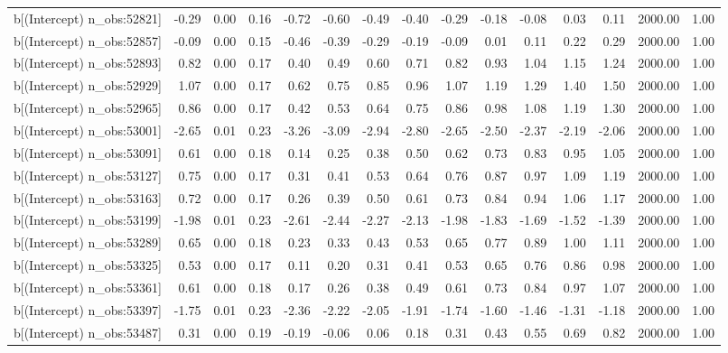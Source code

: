 \begin{table}[ht]
\begin{tabular}{rrrrrrrrrrrrrrr}
  b[(Intercept) n\_obs:52821] & -0.29 & 0.00 & 0.16 & -0.72 & -0.60 & -0.49 & -0.40 & -0.29 & -0.18 & -0.08 & 0.03 & 0.11 & 2000.00 & 1.00 \\ 
  b[(Intercept) n\_obs:52857] & -0.09 & 0.00 & 0.15 & -0.46 & -0.39 & -0.29 & -0.19 & -0.09 & 0.01 & 0.11 & 0.22 & 0.29 & 2000.00 & 1.00 \\ 
  b[(Intercept) n\_obs:52893] & 0.82 & 0.00 & 0.17 & 0.40 & 0.49 & 0.60 & 0.71 & 0.82 & 0.93 & 1.04 & 1.15 & 1.24 & 2000.00 & 1.00 \\ 
  b[(Intercept) n\_obs:52929] & 1.07 & 0.00 & 0.17 & 0.62 & 0.75 & 0.85 & 0.96 & 1.07 & 1.19 & 1.29 & 1.40 & 1.50 & 2000.00 & 1.00 \\ 
  b[(Intercept) n\_obs:52965] & 0.86 & 0.00 & 0.17 & 0.42 & 0.53 & 0.64 & 0.75 & 0.86 & 0.98 & 1.08 & 1.19 & 1.30 & 2000.00 & 1.00 \\ 
  b[(Intercept) n\_obs:53001] & -2.65 & 0.01 & 0.23 & -3.26 & -3.09 & -2.94 & -2.80 & -2.65 & -2.50 & -2.37 & -2.19 & -2.06 & 2000.00 & 1.00 \\ 
  b[(Intercept) n\_obs:53091] & 0.61 & 0.00 & 0.18 & 0.14 & 0.25 & 0.38 & 0.50 & 0.62 & 0.73 & 0.83 & 0.95 & 1.05 & 2000.00 & 1.00 \\ 
  b[(Intercept) n\_obs:53127] & 0.75 & 0.00 & 0.17 & 0.31 & 0.41 & 0.53 & 0.64 & 0.76 & 0.87 & 0.97 & 1.09 & 1.19 & 2000.00 & 1.00 \\ 
  b[(Intercept) n\_obs:53163] & 0.72 & 0.00 & 0.17 & 0.26 & 0.39 & 0.50 & 0.61 & 0.73 & 0.84 & 0.94 & 1.06 & 1.17 & 2000.00 & 1.00 \\ 
  b[(Intercept) n\_obs:53199] & -1.98 & 0.01 & 0.23 & -2.61 & -2.44 & -2.27 & -2.13 & -1.98 & -1.83 & -1.69 & -1.52 & -1.39 & 2000.00 & 1.00 \\ 
  b[(Intercept) n\_obs:53289] & 0.65 & 0.00 & 0.18 & 0.23 & 0.33 & 0.43 & 0.53 & 0.65 & 0.77 & 0.89 & 1.00 & 1.11 & 2000.00 & 1.00 \\ 
  b[(Intercept) n\_obs:53325] & 0.53 & 0.00 & 0.17 & 0.11 & 0.20 & 0.31 & 0.41 & 0.53 & 0.65 & 0.76 & 0.86 & 0.98 & 2000.00 & 1.00 \\ 
  b[(Intercept) n\_obs:53361] & 0.61 & 0.00 & 0.18 & 0.17 & 0.26 & 0.38 & 0.49 & 0.61 & 0.73 & 0.84 & 0.97 & 1.07 & 2000.00 & 1.00 \\ 
  b[(Intercept) n\_obs:53397] & -1.75 & 0.01 & 0.23 & -2.36 & -2.22 & -2.05 & -1.91 & -1.74 & -1.60 & -1.46 & -1.31 & -1.18 & 2000.00 & 1.00 \\ 
  b[(Intercept) n\_obs:53487] & 0.31 & 0.00 & 0.19 & -0.19 & -0.06 & 0.06 & 0.18 & 0.31 & 0.43 & 0.55 & 0.69 & 0.82 & 2000.00 & 1.00 \\ 

\end{tabular}
\end{table}
